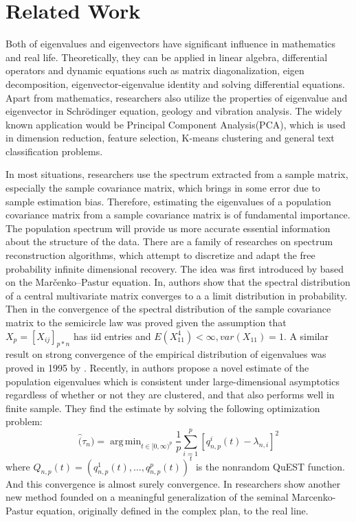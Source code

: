 \documentclass[12pt]{amsart}
\theoremstyle{definition}
\numberwithin{equation}{section}
\numberwithin{equation}{section}
\theoremstyle{remark}
\numberwithin{equation}{section}
\DeclareMathOperator*{\argmin}{arg\,min}
\begin{document}
\section{Related Work}
Both of eigenvalues and eigenvectors have significant influence in mathematics and real life. Theoretically, they can be applied in linear algebra, differential operators and dynamic equations such as matrix diagonalization, eigen decomposition, eigenvector-eigenvalue identity and solving differential equations. Apart from mathematics, researchers also utilize the properties of eigenvalue and eigenvector in Schrödinger equation\cite{cooley1961improved}, geology\cite{graham2000graphical} and vibration analysis. The widely known application would be Principal Component Analysis(PCA)\cite{jolliffe1986principal}, which is used in dimension reduction\cite{kambhatla1997dimension}, feature selection\cite{malhi2004pca,song2010feature,guo2002feature}, K-means clustering\cite{ding2004k} and general text classification problems\cite{gomez2012pca,zahedi2013improving,uuguz2011two,nedungadi2014high}.

In most situations, researchers use the spectrum extracted from a sample matrix, especially the sample covariance matrix, which brings in some error due to sample estimation bias. Therefore, estimating the eigenvalues of a population covariance matrix from a sample covariance matrix is of fundamental importance. The population spectrum will provide us more accurate essential information about the structure of the data. There are a family of researches on spectrum reconstruction algorithms, which attempt to discretize and adapt the free probability infinite dimensional recovery. The idea was first introduced by \cite{el2008spectrum} based on the Marčenko–Pastur equation. In\cite{yin1983limiting}, authors show that the spectral distribution of a central multivariate matrix converges to a a limit distribution in probability. Then in\cite{bai1988convergence} the convergence of the spectral distribution of the sample covariance matrix to the semicircle law was proved given the assumption that $X_{p} = [X_{ij}]_{p*n}$ has iid entries and $E(X_{11}^{4})<\infty, var(X_{11})=1$. A similar result on strong convergence of the empirical distribution of eigenvalues was proved in 1995 by \cite{silverstein1995strong}. Recently, in\cite{ledoit2012nonlinear}\cite{ledoit2015spectrum} authors propose a novel estimate of the population eigenvalues which is consistent under large-dimensional asymptotics regardless of whether or not they are clustered, and that also performs well in finite sample. They find the estimate by solving the following optimization problem:
$$\hat(\tau_{n}) = \argmin_{t\in [0,\infty)^{p}}\frac{1}{p}\sum_{i=1}^{p}[q_{n,p}^{i}(t)-\lambda_{n,i}]^{2}$$
where $Q_{n,p}(t) = (q_{n,p}^{1}(t),\dots,q_{n,p}^{p}(t))^t$ is the nonrandom QuEST function. And this convergence is almost surely convergence. In\cite{li2013estimation} researchers show another new method founded on a meaningful generalization of the seminal Marcenko-Pastur equation, originally defined in the complex plan, to the real line.
\end{document}
